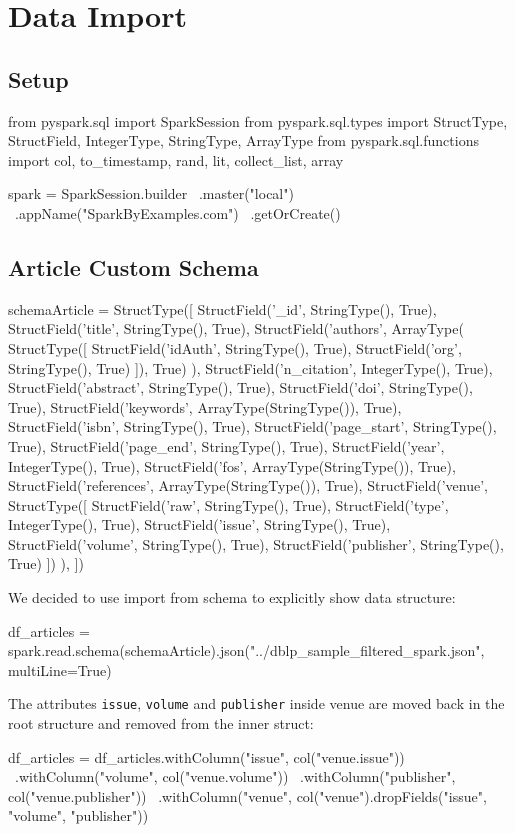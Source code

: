 \documentclass{Configuration_Files/PoliMi3i_thesis}
\begin{document}
\chapter{Data Import}
\label{ch:data_import}
\section{Setup}
\begin{python}
from pyspark.sql import SparkSession
from pyspark.sql.types import StructType, StructField, IntegerType, StringType, ArrayType
from pyspark.sql.functions import col, to_timestamp, rand, lit, collect_list, array

spark = SparkSession.builder \
    .master("local") \
    .appName("SparkByExamples.com") \
    .getOrCreate()
\end{python}

\section{Article Custom Schema}
\begin{python}
schemaArticle = StructType([
    StructField('_id', StringType(), True),
    StructField('title', StringType(), True),
    StructField('authors',
        ArrayType(
        StructType([
            StructField('idAuth', StringType(), True),
            StructField('org', StringType(), True)
        ]), True)
    ),
    StructField('n_citation', IntegerType(), True),
    StructField('abstract', StringType(), True),
    StructField('doi', StringType(), True),
    StructField('keywords', ArrayType(StringType()), True),
    StructField('isbn', StringType(), True),
    StructField('page_start', StringType(), True),
    StructField('page_end', StringType(), True),
    StructField('year', IntegerType(), True),
    StructField('fos', ArrayType(StringType()), True),
    StructField('references', ArrayType(StringType()), True),
    StructField('venue',
        StructType([
            StructField('raw', StringType(), True),
            StructField('type', IntegerType(), True),
            StructField('issue', StringType(), True),
            StructField('volume', StringType(), True),
            StructField('publisher', StringType(), True)
        ])
    ),
])
\end{python}
\bigskip
We decided to use import from schema to explicitly show data structure:
\begin{python}
df_articles = spark.read.schema(schemaArticle).json("../dblp_sample_filtered_spark.json", multiLine=True)
\end{python}
\bigskip
The attributes \verb |issue|, \verb |volume| and \verb |publisher| inside venue are moved back in the root structure
and removed from the inner struct:
\begin{python}
df_articles = df_articles.withColumn("issue", col("venue.issue")) \
                        .withColumn("volume", col("venue.volume")) \
                        .withColumn("publisher", col("venue.publisher")) \
                        .withColumn("venue", col("venue").dropFields("issue", "volume", "publisher"))
\end{python}
\end{document}
